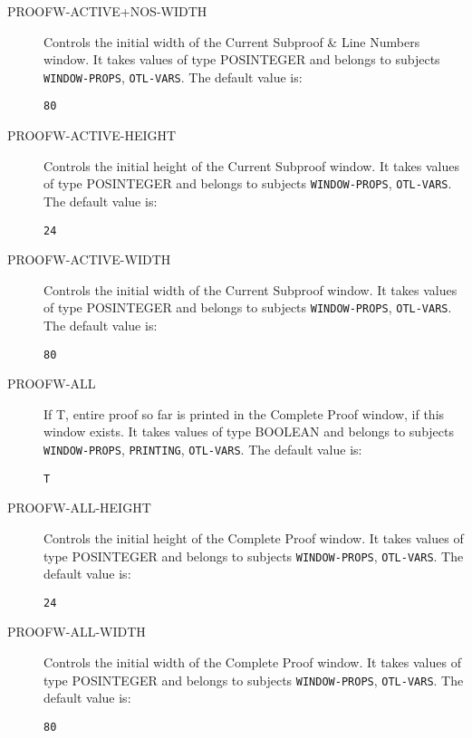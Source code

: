\begin{description}
\item[PROOFW-ACTIVE+NOS-WIDTH]  
Controls the initial width of the Current Subproof \&  Line Numbers
window.
It takes values of type POSINTEGER and belongs to subjects \texttt{WINDOW-PROPS}, \texttt{OTL-VARS}.  The default value is: \begin{lstlisting}
80
\end{lstlisting}

\item[PROOFW-ACTIVE-HEIGHT]  
Controls the initial height of the Current Subproof window.
It takes values of type POSINTEGER and belongs to subjects \texttt{WINDOW-PROPS}, \texttt{OTL-VARS}.  The default value is: \begin{lstlisting}
24
\end{lstlisting}

\item[PROOFW-ACTIVE-WIDTH]  
Controls the initial width of the Current Subproof window.
It takes values of type POSINTEGER and belongs to subjects \texttt{WINDOW-PROPS}, \texttt{OTL-VARS}.  The default value is: \begin{lstlisting}
80
\end{lstlisting}

\item[PROOFW-ALL]  
If T, entire proof so far is printed in the Complete Proof 
window, if this window exists.
It takes values of type BOOLEAN and belongs to subjects \texttt{WINDOW-PROPS}, \texttt{PRINTING}, \texttt{OTL-VARS}.  The default value is: \begin{lstlisting}
T
\end{lstlisting}

\item[PROOFW-ALL-HEIGHT]  
Controls the initial height of the Complete Proof window.
It takes values of type POSINTEGER and belongs to subjects \texttt{WINDOW-PROPS}, \texttt{OTL-VARS}.  The default value is: \begin{lstlisting}
24
\end{lstlisting}

\item[PROOFW-ALL-WIDTH]  
Controls the initial width of the Complete Proof window.
It takes values of type POSINTEGER and belongs to subjects \texttt{WINDOW-PROPS}, \texttt{OTL-VARS}.  The default value is: \begin{lstlisting}
80
\end{lstlisting}


\end{description}
